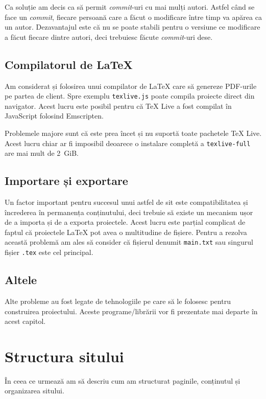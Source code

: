 \documentclass[a4wide,12pt]{report}
\newcommand{\eng}[1]{\emph{#1}} %
\newcommand{\cod}[1]{\texttt{#1}}
\begin{document}
Ca soluție am decis ca să permit \eng{commit}-uri cu mai mulți autori. Astfel
când se face un \eng{commit}, fiecare persoană care a făcut o modificare între
timp va apărea ca un autor. Dezavantajul este că nu se poate stabili pentru o
versiune ce modificare a făcut fiecare dintre autori, deci trebuiesc făcute
\eng{commit}-uri dese.

\subsection{Compilatorul de \LaTeX}

Am considerat și folosirea unui compilator de \LaTeX{} care să genereze
PDF-urile pe partea de client. Spre exemplu \cod{texlive.js}\cite{texlivejs}
poate compila proiecte direct din navigator. Acest lucru este posibil pentru că
\TeX{} Live a fost compilat în JavaScript folosind Emscripten.

Problemele majore sunt că este prea încet și nu suportă toate pachetele \TeX{}
Live. Acest lucru chiar ar fi imposibil deoarece o instalare completă a
\cod{texlive-full} are mai mult de 2~GiB.

\subsection{Importare și exportare}

Un factor important pentru succesul unui astfel de sit este compatibilitatea și
încrederea în permanența conținutului, deci trebuie să existe un mecanism ușor
de a importa și de a exporta proiectele. Acest lucru este parțial complicat de
faptul că proiectele \LaTeX{} pot avea o multitudine de fișiere. Pentru a
rezolva această problemă am ales să consider că fișierul denumit \cod{main.txt}
sau singurul fișier \cod{.tex} este cel principal.

\subsection{Altele}

Alte probleme au fost legate de tehnologiile pe care să le folosesc pentru
construirea proiectului. Aceste programe/librării vor fi prezentate mai departe
în acest capitol.

\section{Structura sitului}

În ceea ce urmează am să descriu cum am structurat paginile, conținutul și
organizarea sitului.
\end{document}
